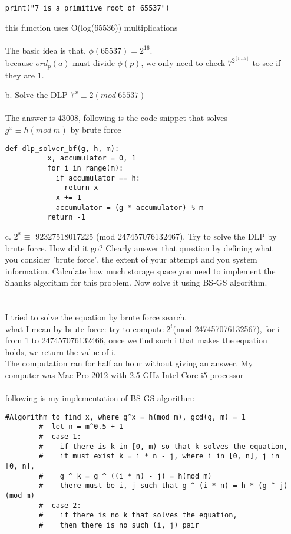 \documentclass[12pt,letterpaper]{article}
\begin{document}
\begin{enumerate}
\begin{lstlisting}[style = Python]
          print("7 is a primitive root of 65537")
      \end{lstlisting}
      this function uses O(log(65536)) multiplications \\
      \\ The basic idea is that, $\phi(65537) = 2^{16}$. \\
      because $ord_p(a)$ must divide  $\phi(p)$, we only need to check $7^{2^{[1..15]}}$ to see if they are 1.  
    \\
    \item[b.]
      Solve the DLP $7^x \equiv 2 (mod \ 65537)$ 
      \\ 
      \\
      The answer is 43008, following is the code snippet that solves $g^x \equiv h(mod \ m)$ by brute force
      \begin{lstlisting}[style = Python]
        def dlp_solver_bf(g, h, m):
          x, accumulator = 0, 1
          for i in range(m):
            if accumulator == h:
              return x
            x += 1
            accumulator = (g * accumulator) % m
          return -1
      \end{lstlisting}
    \item[c.]
      $2^x \equiv$ 92327518017225 (mod 247457076132467).  Try to solve the DLP by brute force.  How did it go? Clearly answer that question by defining what you consider 'brute force', the extent of your attempt and you system information.  Calculate how much storage space you need to implement the Shanks algorithm for this problem.  Now solve it using BS-GS algorithm.
      \\ 
      \\
      \\
      I tried to solve the equation by brute force search. \\
      what I mean by brute force: try to compute $2^i$(mod  247457076132567), for i from 1 to 247457076132466, once we find such i that makes the equation holds, we return the value of i.\\
      The computation ran for half an hour without giving an answer.  My computer was Mac Pro 2012 with 2.5 GHz Intel Core i5 processor
      \\ \\ 
      following is my implementation of BS-GS algorithm:
      \begin{lstlisting}[style = Python]
        #Algorithm to find x, where g^x = h(mod m), gcd(g, m) = 1
        #  let n = m^0.5 + 1
        #  case 1: 
        #    if there is k in [0, m) so that k solves the equation,
        #    it must exist k = i * n - j, where i in [0, n], j in [0, n],
        #    g ^ k = g ^ ((i * n) - j) = h(mod m)
        #    there must be i, j such that g ^ (i * n) = h * (g ^ j) (mod m)
        #  case 2: 
        #    if there is no k that solves the equation, 
        #    then there is no such (i, j) pair


\end{lstlisting}
\end{enumerate}
\end{document}
